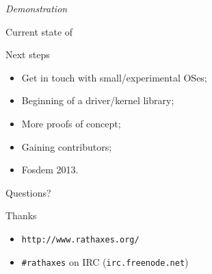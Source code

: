 \documentclass[xcolor={usenames,svgnames}]{beamer}
\begin{document}
\begin{frame}{}%
	\begin{center}
	\Huge{\emph{Demonstration}}
	\end{center}
\end{frame}


\begin{frame}{Current state of \rtx}
\end{frame}

\begin{frame}{Next steps}
    \begin{center}
        \Large{%
	\begin{itemize}
            \item Get in touch with small/experimental OSes;
            \item Beginning of a driver/kernel library;
            \item More proofs of concept;
            \item Gaining contributors;
            \item Fosdem 2013.
	\end{itemize}
        }
    \end{center}
\end{frame}

\begin{frame}{Questions?}
\begin{center}
\Huge{Thanks}

\end{center}

\vspace{2em}
\begin{itemize}
\item \Large{\texttt{http://www.rathaxes.org/}}
\item \Large{\texttt{\#rathaxes} on IRC (\texttt{irc.freenode.net})}
\end{itemize}
\end{frame}
\end{document}
